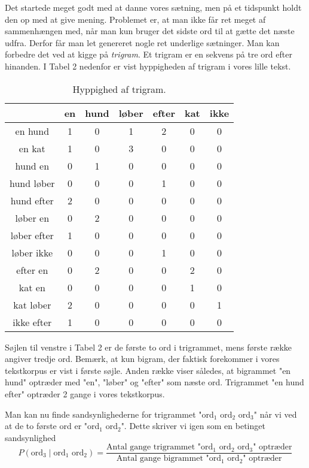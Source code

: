 \documentclass{article}
\begin{document}
Det startede meget godt med at danne vores sætning, men på et tidspunkt holdt den op med at give mening.
Problemet er, at man ikke får ret meget af sammenhængen med, når man kun bruger det sidste ord til at gætte det næste udfra. Derfor får man let genereret nogle ret underlige sætninger. Man kan forbedre det ved at kigge på \emph{trigram}. Et trigram er en sekvens på tre ord efter hinanden. I Tabel 2 nedenfor er vist hyppigheden af trigram i vores lille tekst.  

\begin{table}[h]
    \centering
    \begin{tabular}{c|cccccc}
         &  en&hund  & løber & efter & kat & ikke\\
         \hline
      en hund   & 1 &  0& 1 & 2 & 0 & 0\\
      en kat   & 1 &0  &3  &0  &0  &0 \\
       hund en   & 0 & 1 & 0 & 0 & 0 &0 \\
       hund løber  & 0 & 0 & 0 & 1 & 0 &0 \\
      hund efter   &2  &0  &0  & 0 & 0 & 0\\
       løber en  &0  & 2 & 0 & 0 & 0 & 0\\
       løber efter  & 1 & 0 &0  & 0 & 0 & 0\\
       løber ikke  & 0 & 0 & 0 &1  & 0 & 0\\
      efter en   & 0 & 2 & 0 & 0 & 2 & 0\\
        kat en   & 0 & 0 & 0 & 0 & 1 & 0\\
       kat løber  &2  & 0 & 0 & 0 & 0 &1 \\
      ikke efter   & 1 & 0 & 0 & 0 & 0 & 0\\
    \end{tabular}
    \caption{Hyppighed af trigram.}
    \label{tab:my_label}
\end{table}
 Søjlen til venstre i Tabel 2 er de første to ord i trigrammet, mens første række angiver tredje ord. Bemærk, at kun bigram, der faktisk forekommer i vores tekstkorpus er vist i første søjle. Anden række viser således, at bigrammet "en hund" optræder med "en", "løber" og "efter" som næste ord. Trigrammet "en hund efter" optræder 2 gange i vores tekstkorpus.

Man kan nu finde sandsynlighederne for trigrammet "ord$_1$ ord$_2$ ord$_3$" når vi ved at de to første ord er "ord$_1$ ord$_2$". Dette skriver vi igen som en betinget sandsynlighed
$$P(\text{ord}_3\mid \text{ord}_1\text{ ord}_2) = \frac{\text{Antal gange trigrammet "ord$_1$ ord$_2$ ord$_3$" optræder}}{\text{Antal gange bigrammet "ord$_1$ ord$_2$" optræder}}$$
\end{document}
